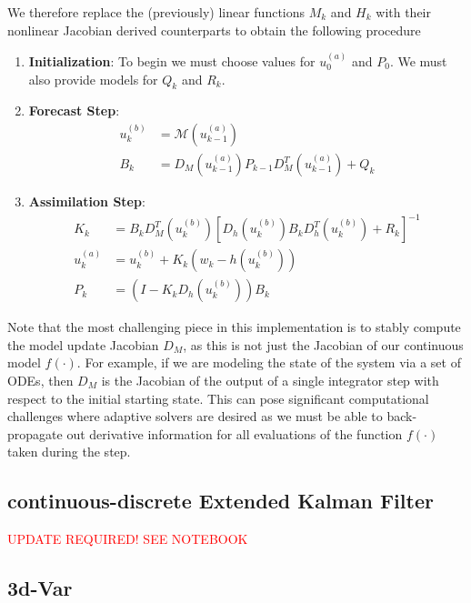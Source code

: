 We therefore replace the (previously) linear functions $M_k$ and $H_k$ with their nonlinear Jacobian derived counterparts to obtain the following procedure
\begin{enumerate}
\item \textbf{Initialization}: To begin we must choose values for $u_0^{(a)}$ and $P_0$. We must also provide models for $Q_k$ and $R_k$.
\item \textbf{Forecast Step}:
\begin{align}
    u_k^{(b)} &= \mathcal{M}(u_{k-1}^{(a)}) \\
    B_k &= D_M(u_{k-1}^{(a)})P_{k-1}D_M^T(u_{k-1}^{(a)}) + Q_k
\end{align}
\item \textbf{Assimilation Step}:
\begin{align}
    K_k &= B_kD_M^T(u_k^{(b)})\left[ D_h(u_k^{(b)})B_kD_h^T(u_k^{(b)}) + R_k \right]^{-1}\\
    u_k^{(a)} &= u_k^{(b)} + K_k(w_k - h(u_k^{(b)})) \\
    P_k &= \left( I - K_kD_h(u_k^{(b)}) \right)B_k
\end{align}
\end{enumerate}
Note that the most challenging piece in this implementation is to stably compute the model update Jacobian $D_M$, as this is not just the Jacobian of our continuous model $f(\cdot)$. For example, if we are modeling the state of the system via a set of ODEs, then $D_M$ is the Jacobian of the output of a single integrator step with respect to the initial starting state. This can pose significant computational challenges where adaptive solvers are desired as we must be able to back-propagate out derivative information for all evaluations of the function $f(\cdot)$ taken during the step.


\subsection{continuous-discrete Extended Kalman Filter}

\textcolor{red}{UPDATE REQUIRED! SEE NOTEBOOK}

\subsection{3d-Var}

